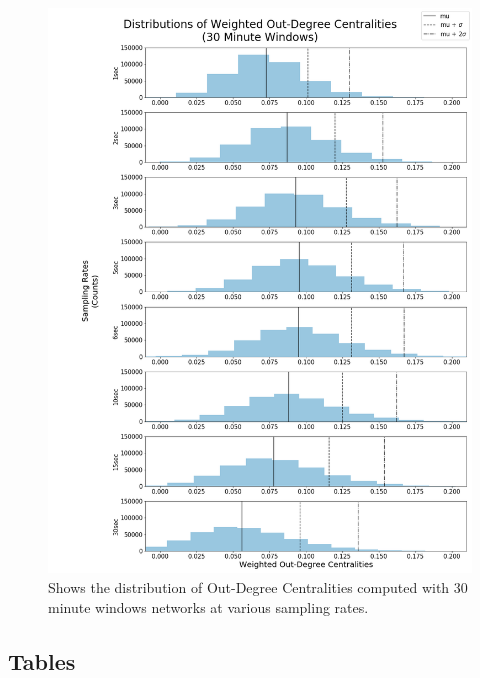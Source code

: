 \begin{figure}[!htb]
  \centerline{\includegraphics[scale=0.42]{figures/PredIF/30MinDist-OutDeg.png}}
  \caption{Shows the distribution of Out-Degree Centralities computed with 30 minute windows networks at various sampling rates.}
  \label{fig:30MinDist-OutDeg}
\end{figure}

\newpage
\subsection{Tables}

